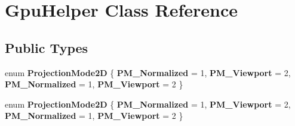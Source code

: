 \hypertarget{class_gpu_helper}{}\section{Gpu\+Helper Class Reference}
\label{class_gpu_helper}
\subsection*{Public Types}
\begin{DoxyCompactItemize}
\item 
\mbox{\label{class_gpu_helper_a006736da3423b52666ef375be9af4d0e}} 
enum {\bfseries Projection\+Mode2D} \{ {\bfseries P\+M\+\_\+\+Normalized} = 1, 
{\bfseries P\+M\+\_\+\+Viewport} = 2, 
{\bfseries P\+M\+\_\+\+Normalized} = 1, 
{\bfseries P\+M\+\_\+\+Viewport} = 2
 \}
\item 
\mbox{\label{class_gpu_helper_a006736da3423b52666ef375be9af4d0e}} 
enum {\bfseries Projection\+Mode2D} \{ {\bfseries P\+M\+\_\+\+Normalized} = 1, 
{\bfseries P\+M\+\_\+\+Viewport} = 2, 
{\bfseries P\+M\+\_\+\+Normalized} = 1, 
{\bfseries P\+M\+\_\+\+Viewport} = 2
 \}
\end{DoxyCompactItemize}
